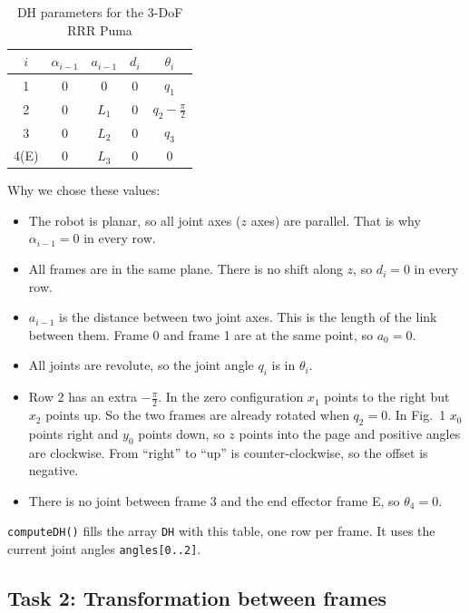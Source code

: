 \documentclass[11pt, a4paper]{article}
\begin{document}
\begin{table}[H]
  \centering
  \caption{DH parameters for the 3-DoF RRR Puma}
  \begin{tabular}{c c c c c}
    \toprule
    $i$ & $\alpha_{i-1}$ & $a_{i-1}$ & $d_i$ & $\theta_i$ \\
    \midrule
    1    & 0 & 0     & 0 & $q_1$ \\
    2    & 0 & $L_1$ & 0 & $q_2 - \frac{\pi}{2}$ \\
    3    & 0 & $L_2$ & 0 & $q_3$ \\
    4(E) & 0 & $L_3$ & 0 & 0 \\
    \bottomrule
  \end{tabular}
\end{table}

Why we chose these values:

\begin{itemize}
  \item The robot is planar, so all joint axes ($z$ axes) are parallel. That is why
        $\alpha_{i-1} = 0$ in every row.
  \item All frames are in the same plane. There is no shift along $z$, so $d_i = 0$ in every row.
  \item $a_{i-1}$ is the distance between two joint axes. This is the length of the link between them.
        Frame 0 and frame 1 are at the same point, so $a_0 = 0$.
  \item All joints are revolute, so the joint angle $q_i$ is in $\theta_i$.
  \item Row 2 has an extra $-\frac{\pi}{2}$. In the zero configuration $x_1$ points to the right but
        $x_2$ points up. So the two frames are already rotated when $q_2 = 0$. In Fig.~1 $x_0$ points
        right and $y_0$ points down, so $z$ points into the page and positive angles are clockwise.
        From ``right'' to ``up'' is counter-clockwise, so the offset is negative.
  \item There is no joint between frame 3 and the end effector frame E, so $\theta_4 = 0$.
\end{itemize}

\texttt{computeDH()} fills the array \texttt{DH} with this table, one row per frame. It uses the
current joint angles \texttt{angles[0..2]}.

\subsection*{Task 2: Transformation between frames}
\end{document}
